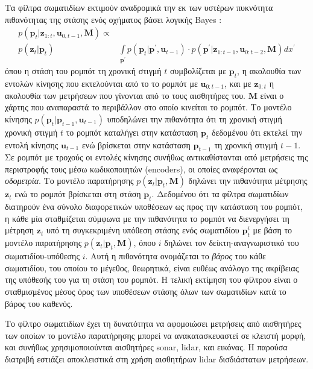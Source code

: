 Τα φίλτρα σωματιδίων εκτιμούν αναδρομικά την εκ των υστέρων πυκνότητα
πιθανότητας της στάσης ενός οχήματος βάσει λογικής Bayes
\cite{thrun2005probabilistic}:
\begin{align}
  \label{eq:pf_posterior}
  p(\bm{p}_t | \bm{z}_{1:t}, \bm{u}_{0,t-1}, \bm{M}) \propto & \nonumber \\
    p(\bm{z}_t | \bm{p}_t) &\int\limits_{\bm{p}^{\prime}} p(\bm{p}_t | \bm{p}^{\prime}, \bm{u}_{t-1}) \cdot p(\bm{p}^{\prime} | \bm{z}_{1:t-1}, \bm{u}_{0:t-2}, \bm{M}) dx^{\prime}
\end{align}
όπου η στάση του ρομπότ τη χρονική στιγμή $t$ συμβολίζεται με $\bm{p}_t$, η
ακολουθία των εντολών κίνησης που εκτελούνται από το το ρομπότ με
$\bm{u}_{0:t-1}$, και με $\bm{z}_{0:t}$ η ακολουθία των μετρήσεων που
γίνονται από το τους αισθητήρες του. $\bm{M}$ είναι ο χάρτης που αναπαραστά το
περιβάλλον στο οποίο κινείται το ρομπότ. Το μοντέλο κίνησης $p(\bm{p}_t |
\bm{p}_{t-1}, \bm{u}_{t-1})$ υποδηλώνει την πιθανότητα ότι τη χρονική στιγμή
χρονική στιγμή $t$ το ρομπότ καταλήγει στην κατάσταση $\bm{p}_t$ δεδομένου ότι
εκτελεί την εντολή κίνησης $\bm{u}_{t-1}$ ενώ βρίσκεται στην κατάσταση
$\bm{p}_{t-1}$ τη χρονική στιγμή $t-1$. Σε ρομπότ με τροχούς οι εντολές
κίνησης συνήθως αντικαθίστανται από μετρήσεις της περιστροφής τους μέσω
κωδικοποιητών (encoders), οι οποίες αναφέρονται ως \textit{οδομετρία}. Το
μοντέλο παρατήρησης $p(\bm{z}_t | \bm{p}_t, \bm{M})$ δηλώνει την πιθανότητα
μέτρησης $\bm{z}_t$ ενώ το ρομπότ βρίσκεται στη στάση $\bm{p}_t$.
Δεδομένου ότι τα φίλτρα σωματιδίων διατηρούν ένα σύνολο διαφορετικών υποθέσεων
ως προς την κατάσταση του ρομπότ, η κάθε μία σταθμίζεται σύμφωνα με την
πιθανότητα το ρομπότ να διενεργήσει τη μέτρηση $\bm{z}_t$ υπό τη συγκεκριμένη
υπόθεση στάσης ενός σωματιδίου $\bm{p}_t^i$ με βάση το μοντέλο παρατήρησης
$p(\bm{z}_t | \bm{p}_t, \bm{M})$, όπου $i$ δηλώνει τον δείκτη-αναγνωριστικό του
σωματιδίου-υπόθεσης $i$. Αυτή η πιθανότητα ονομάζεται το \textit{βάρος} του κάθε
σωματιδίου, του οποίου το μέγεθος, θεωρητικά, είναι ευθέως ανάλογο της ακρίβειας
της υπόθεσής του για τη στάση του ρομπότ. Η τελική εκτίμηση του φίλτρου είναι ο
σταθμισμένος μέσος όρος των υποθέσεων στάσης όλων των σωματιδίων κατά το βάρος
του καθενός.

Το φίλτρο σωματιδίων έχει τη δυνατότητα να αφομοιώσει μετρήσεις από αισθητήρες
των οποίων το μοντέλο παρατήρησης μπορεί να ανακατασκευαστεί σε κλειστή μορφή,
και συνήθως χρησιμοποιούνται αισθητήρες sonar, lidar, και εικόνας. Η παρούσα
διατριβή εστιάζει αποκλειστικά στη χρήση αισθητήρων lidar δισδιάστατων
μετρήσεων.


